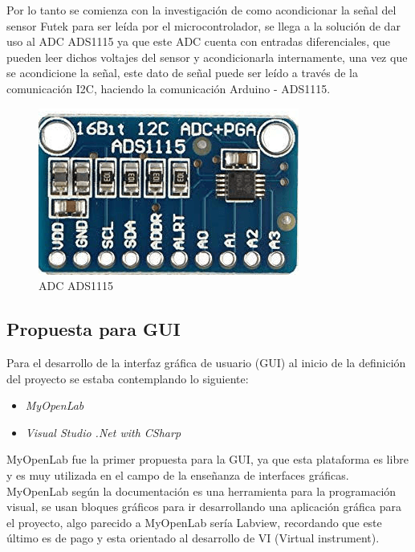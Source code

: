 \documentclass[12pt,titlepage]{article}
\begin{document}
Por lo tanto se comienza con la investigación de como acondicionar la señal del sensor Futek para ser leída por el microcontrolador, se llega a la solución de dar uso al ADC ADS1115 ya que este ADC cuenta con entradas diferenciales, que pueden leer dichos voltajes del sensor y acondicionarla internamente, una vez que se acondicione la señal, este dato de señal puede ser leído a través de la comunicación I2C, haciendo la comunicación Arduino - ADS1115. \\

\begin{figure}[htbp]
\hspace*{6.1cm} 
\includegraphics[scale=0.48]{ADS1115}
\caption{ADC ADS1115}
\end{figure}

 


\newpage
\subsection{Propuesta para GUI}
Para el desarrollo de la interfaz gráfica de usuario (GUI) al inicio de la definición del proyecto se estaba contemplando lo siguiente: \\ 

\begin{itemize}
\item \textit{MyOpenLab}
\item \textit{Visual Studio .Net with CSharp}
\end{itemize}

MyOpenLab fue la primer propuesta para la GUI, ya que esta plataforma es libre y es muy utilizada en el campo de la enseñanza de interfaces gráficas. \\

MyOpenLab según la documentación es una herramienta para la programación visual, se usan bloques gráficos para ir desarrollando una aplicación gráfica para el proyecto, algo parecido a MyOpenLab sería Labview, recordando que este último es de pago y esta orientado al desarrollo de VI (Virtual instrument).\\ 
\end{document}
